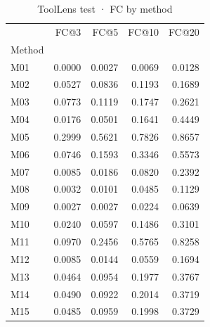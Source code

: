 \begin{table}
\caption{ToolLens test · FC by method}
\label{tab:ToolLens-test-comparison-comparison-fullcoverage}
\begin{tabular}{lrrrr}
\toprule
 & FC@3 & FC@5 & FC@10 & FC@20 \\
Method &  &  &  &  \\
\midrule
M01 & 0.0000 & 0.0027 & 0.0069 & 0.0128 \\
M02 & 0.0527 & 0.0836 & 0.1193 & 0.1689 \\
M03 & 0.0773 & 0.1119 & 0.1747 & 0.2621 \\
M04 & 0.0176 & 0.0501 & 0.1641 & 0.4449 \\
M05 & 0.2999 & 0.5621 & 0.7826 & 0.8657 \\
M06 & 0.0746 & 0.1593 & 0.3346 & 0.5573 \\
M07 & 0.0085 & 0.0186 & 0.0820 & 0.2392 \\
M08 & 0.0032 & 0.0101 & 0.0485 & 0.1129 \\
M09 & 0.0027 & 0.0027 & 0.0224 & 0.0639 \\
M10 & 0.0240 & 0.0597 & 0.1486 & 0.3101 \\
M11 & 0.0970 & 0.2456 & 0.5765 & 0.8258 \\
M12 & 0.0085 & 0.0144 & 0.0559 & 0.1694 \\
M13 & 0.0464 & 0.0954 & 0.1977 & 0.3767 \\
M14 & 0.0490 & 0.0922 & 0.2014 & 0.3719 \\
M15 & 0.0485 & 0.0959 & 0.1998 & 0.3729 \\
\bottomrule
\end{tabular}
\end{table}
